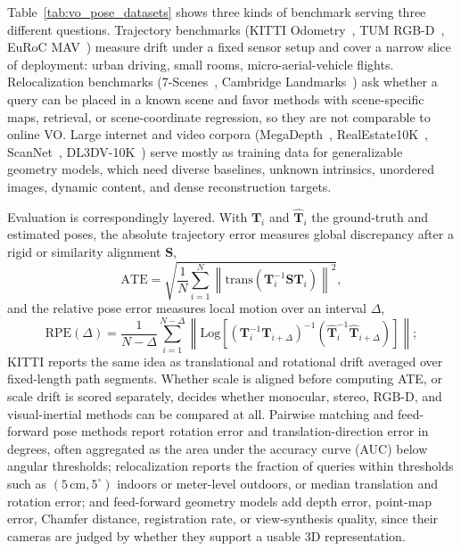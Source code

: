 Table~\ref{tab:vo_pose_datasets} shows three kinds of benchmark serving three different questions.
Trajectory benchmarks (KITTI Odometry~\cite{KITTI-GeigerLU12}, TUM RGB-D~\cite{Sturm2012TUMRGBD}, EuRoC MAV~\cite{Burri2016EuRoC}) measure drift under a fixed sensor setup and cover a narrow slice of deployment: urban driving, small rooms, micro-aerial-vehicle flights.
Relocalization benchmarks (7-Scenes~\cite{Scene_Coordinate}, Cambridge Landmarks~\cite{kendall2015posenet}) ask whether a query can be placed in a known scene and favor methods with scene-specific maps, retrieval, or scene-coordinate regression, so they are not comparable to online VO.
Large internet and video corpora (MegaDepth~\cite{li2018megadepth}, RealEstate10K~\cite{zhou2018stereo}, ScanNet~\cite{dai2017scannet}, DL3DV-10K~\cite{ling2024dl3dv}) serve mostly as training data for generalizable geometry models, which need diverse baselines, unknown intrinsics, unordered images, dynamic content, and dense reconstruction targets.

Evaluation is correspondingly layered.
With $\mathbf{T}_i$ and $\hat{\mathbf{T}}_i$ the ground-truth and estimated poses, the absolute trajectory error measures global discrepancy after a rigid or similarity alignment $\mathbf{S}$,
\begin{equation}
    \mathrm{ATE} =
    \sqrt{\frac{1}{N}\sum_{i=1}^{N}
    \left\|\mathrm{trans}\!\left(\mathbf{T}_i^{-1}\mathbf{S}\hat{\mathbf{T}}_i\right)\right\|^2},
\end{equation}
and the relative pose error measures local motion over an interval $\Delta$,
\begin{equation}
    \mathrm{RPE}(\Delta)=
    \frac{1}{N-\Delta}\sum_{i=1}^{N-\Delta}
    \left\|\mathrm{Log}\!\left[
    (\mathbf{T}_i^{-1}\mathbf{T}_{i+\Delta})^{-1}
    (\hat{\mathbf{T}}_i^{-1}\hat{\mathbf{T}}_{i+\Delta})
    \right]\right\|;
\end{equation}
KITTI reports the same idea as translational and rotational drift averaged over fixed-length path segments.
Whether scale is aligned before computing ATE, or scale drift is scored separately, decides whether monocular, stereo, RGB-D, and visual-inertial methods can be compared at all.
Pairwise matching and feed-forward pose methods report rotation error and translation-direction error in degrees, often aggregated as the area under the accuracy curve (AUC) below angular thresholds; relocalization reports the fraction of queries within thresholds such as $(5\,\mathrm{cm},5^\circ)$ indoors or meter-level outdoors, or median translation and rotation error; and feed-forward geometry models add depth error, point-map error, Chamfer distance, registration rate, or view-synthesis quality, since their cameras are judged by whether they support a usable 3D representation.

